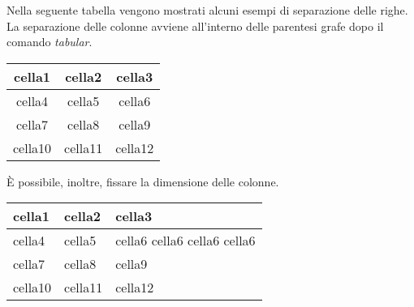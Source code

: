 Nella seguente tabella vengono mostrati alcuni esempi di separazione delle righe. La separazione delle colonne avviene  all'interno delle parentesi grafe dopo il comando \textit{tabular}.
\begin{center}
    \begin{tabular}{ ||c|c|c|| } 
        \hline
        cella1 & cella2 & cella3 \\
        \hline\hline 
        cella4 & cella5 & cella6 \\ 
        \hline
        cella7 & cella8 & cella9 \\ 
        cella10 & cella11 & cella12 \\ 
        \hline
    \end{tabular}
\end{center}

È possibile, inoltre, fissare la dimensione delle colonne.

\begin{center}
    \begin{tabular}{ | m{3cm} | m{5cm} | m{1.5cm} | } 
        \hline
        cella1 & cella2 & cella3 \\
        \hline\hline 
        cella4 & cella5 & cella6 cella6 cella6 cella6 \\ 
        \hline
        cella7 & cella8 & cella9 \\ 
        cella10 & cella11 & cella12 \\ 
        \hline
    \end{tabular}
\end{center}
